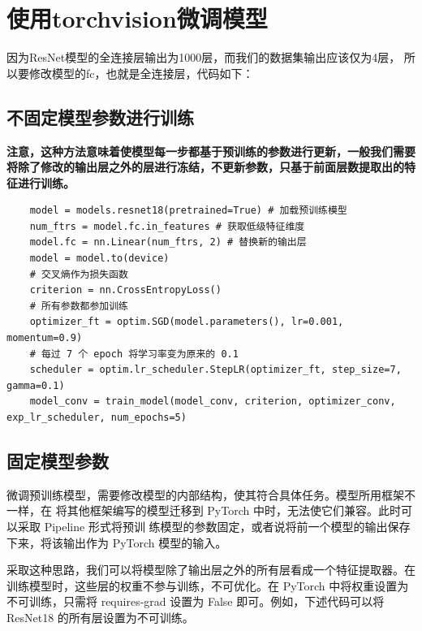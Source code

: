\documentclass[12pt, a4paper, oneside]{ctexart} %
\begin{document}
\section{使用torchvision微调模型}

因为ResNet模型的全连接层输出为1000层，而我们的数据集输出应该仅为4层，
所以要修改模型的fc，也就是全连接层，代码如下：

\subsection{不固定模型参数进行训练}

\textbf{注意，这种方法意味着使模型每一步都基于预训练的参数进行更新，一般我们需要将除了修改的输出层之外的层进行冻结，不更新参数，只基于前面层数提取出的特征进行训练。}

\begin{lstlisting}
    model = models.resnet18(pretrained=True) # 加载预训练模型
    num_ftrs = model.fc.in_features # 获取低级特征维度 
    model.fc = nn.Linear(num_ftrs, 2) # 替换新的输出层 
    model = model.to(device) 
    # 交叉熵作为损失函数 
    criterion = nn.CrossEntropyLoss() 
    # 所有参数都参加训练 
    optimizer_ft = optim.SGD(model.parameters(), lr=0.001, momentum=0.9) 
    # 每过 7 个 epoch 将学习率变为原来的 0.1 
    scheduler = optim.lr_scheduler.StepLR(optimizer_ft, step_size=7, gamma=0.1)
    model_conv = train_model(model_conv, criterion, optimizer_conv, exp_lr_scheduler, num_epochs=5)
\end{lstlisting}


\subsection{固定模型参数}

微调预训练模型，需要修改模型的内部结构，使其符合具体任务。模型所用框架不一样，在 将其他框架编写的模型迁移到 PyTorch 中时，无法使它们兼容。此时可以采取 Pipeline 形式将预训 练模型的参数固定，或者说将前一个模型的输出保存下来，将该输出作为 PyTorch 模型的输入。


采取这种思路，我们可以将模型除了输出层之外的所有层看成一个特征提取器。在训练模型时，这些层的权重不参与训练，不可优化。在 PyTorch 中将权重设置为不可训练，只需将 requires-grad 设置为 False 即可。例如，下述代码可以将 ResNet18 的所有层设置为不可训练。
\end{document}
